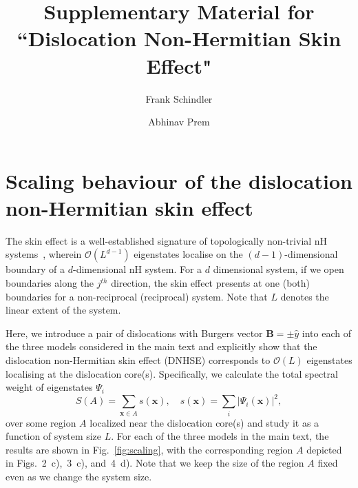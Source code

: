 \documentclass[prb,reprint,twocolumn,preprintnumbers,amsmath,amssymb,showpacs,nofootinbib,superscriptaddress]{revtex4-2}
\newcommand{\bs}[1]{\boldsymbol{#1}}
\begin{document}
\title{Supplementary Material for ``Dislocation Non-Hermitian Skin Effect"}

\author{Frank Schindler}

\author{Abhinav Prem}

\maketitle


\renewcommand{\bibnumfmt}[1]{[S#1]}
\renewcommand{\theequation}{S\arabic{equation}}
\renewcommand{\thefigure}{S\arabic{figure}}
\renewcommand{\thetable}{S.\Roman{table}}

\setcounter{equation}{0}
\setcounter{figure}{0}
\setcounter{table}{0}

\onecolumngrid


\tableofcontents


\section{Scaling behaviour of the dislocation non-Hermitian skin effect}
\label{sec:scaling}

The skin effect is a well-established signature of topologically non-trivial nH systems~\cite{zhang2020correspondence,TopoSkin20}, wherein $\mathcal{O}(L^{d-1})$ eigenstates localise on the $(d-1)$-dimensional boundary of a $d$-dimensional nH system. For a $d$ dimensional system, if we open boundaries along the $j^{th}$ direction, the skin effect presents at one (both) boundaries for a non-reciprocal (reciprocal) system. Note that $L$ denotes the linear extent of the system. 

Here, we introduce a pair of dislocations with Burgers vector $\bs{B}=\pm\hat{y}$ into each of the three models considered in the main text and explicitly show that the dislocation non-Hermitian skin effect (DNHSE) corresponds to $\mathcal{O}(L)$ eigenstates localising at the dislocation core(s). Specifically, we calculate the total spectral weight of eigenstates $\Psi_i$
\begin{equation}
    S(A) = \sum_{{\bs x} \in A} s({\bs x}), \quad s({\bs x}) = \sum_i |\Psi_i({\bs x})|^2 ,
\end{equation}
over some region $A$ localized near the dislocation core(s) and study it as a function of system size $L$. For each of the three models in the main text, the results are shown in Fig.~\ref{fig:scaling}, with the corresponding region $A$ depicted in Figs.~2~c),~3~c), and~4~d). Note that we keep the size of the region $A$ fixed even as we change the system size. 
\end{document}
